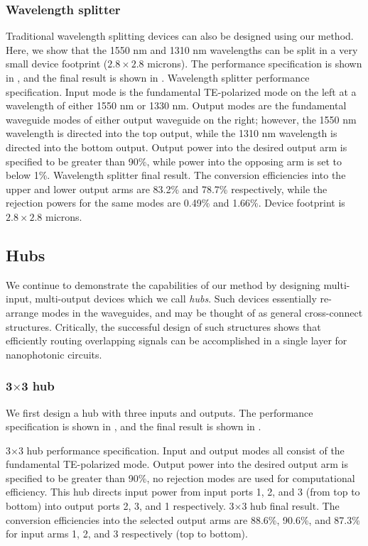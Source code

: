 \subsubsection{Wavelength splitter}
Traditional wavelength splitting devices can also be designed using our method.
Here, we show that the 1550 nm and 1310 nm wavelengths can be split
    in a very small device footprint ($2.8\times2.8$ microns).
The performance specification is shown in , 
    and the final result is shown in .
    {Wavelength splitter performance specification.
    Input mode is the fundamental TE-polarized mode on the left at 
        a wavelength of either 1550 nm or 1330 nm.
    Output modes are the fundamental waveguide modes of either output 
        waveguide on the right;
        however, the 1550 nm wavelength is directed into the top output, 
        while the 1310 nm wavelength is directed into the bottom output.
    Output power into the desired output arm is specified to be greater than 90\%,
        while power into the opposing arm is set to below 1\%.}
    {Wavelength splitter final result.
    The conversion efficiencies into the upper and lower output arms
        are 83.2\% and 78.7\% respectively, 
        while the rejection powers for the same modes are 0.49\% and 1.66\%.
    Device footprint is $2.8\times2.8$ microns.}

\subsection{Hubs}
We continue to demonstrate the capabilities of our method
    by designing multi-input, multi-output devices which we call \emph{hubs}.
Such devices essentially re-arrange modes in the waveguides,
    and may be thought of as general cross-connect structures.
Critically, the successful design of such structures 
    shows that efficiently routing overlapping signals can be 
    accomplished in a single layer for nanophotonic circuits.

\subsubsection{3$\times$3 hub}
We first design a hub with three inputs and outputs.
The performance specification is shown in ,
    and the final result is shown in .

    {3$\times$3 hub performance specification.
    Input and output modes all consist of the fundamental TE-polarized mode.
    Output power into the desired output arm is specified to be greater than 90\%,
        no rejection modes are used for computational efficiency.
    This hub directs input power from input ports 1, 2, and 3 (from top to bottom)
    into output ports 2, 3, and 1 respectively.}
    {3$\times$3 hub final result.
    The conversion efficiencies into the selected output arms
        are 88.6\%, 90.6\%, and 87.3\% for 
        input arms 1, 2, and 3 respectively (top to bottom).}

